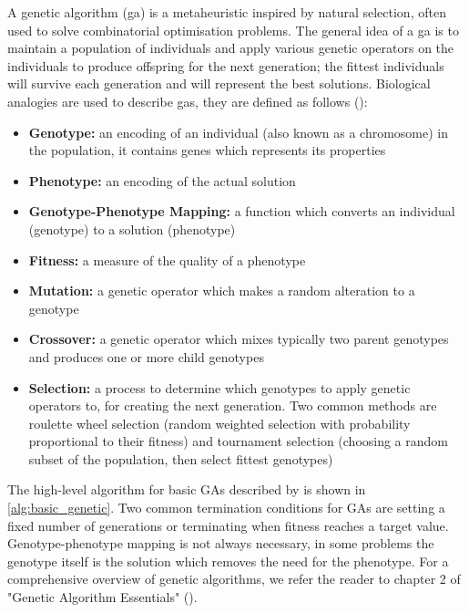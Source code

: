 A genetic algorithm (\acrshort{ga}) is a \gls{metaheuristic} inspired by natural selection, often used to solve combinatorial optimisation problems. The general idea of a \acrshort{ga} is to maintain a population of individuals and apply various genetic operators on the individuals to produce offspring for the next generation; the fittest individuals will survive each generation and will represent the best solutions. Biological analogies are used to describe \acrshort{ga}s, they are defined as follows (\cite{kramer_genetic_2017}):
\begin{itemize}
    \item \textbf{Genotype:} an encoding of an individual (also known as a chromosome) in the population, it contains genes which represents its properties
    \item \textbf{Phenotype:} an encoding of the actual solution
    \item \textbf{Genotype-Phenotype Mapping:} a function which converts an individual (genotype) to a solution (phenotype)
    \item \textbf{Fitness:} a measure of the quality of a phenotype
    \item \textbf{Mutation:} a genetic operator which makes a random alteration to a genotype
    \item \textbf{Crossover:} a genetic operator which mixes typically two parent genotypes and produces one or more child genotypes
    \item \textbf{Selection:} a process to determine which genotypes to apply genetic operators to, for creating the next generation. Two common methods are roulette wheel selection (random weighted selection with probability proportional to their fitness) and tournament selection (choosing a random subset of the population, then select fittest genotypes)
\end{itemize}

The high-level algorithm for basic GAs described by \textcite{kramer_genetic_2017} is shown in \cref{alg:basic_genetic}. Two common termination conditions for GAs are setting a fixed number of generations or terminating when fitness reaches a target value. Genotype-phenotype mapping is not always necessary, in some problems the genotype itself is the solution which removes the need for the phenotype. For a comprehensive overview of genetic algorithms, we refer the reader to chapter 2 of "Genetic Algorithm Essentials" (\cite{kramer_genetic_2017}).



